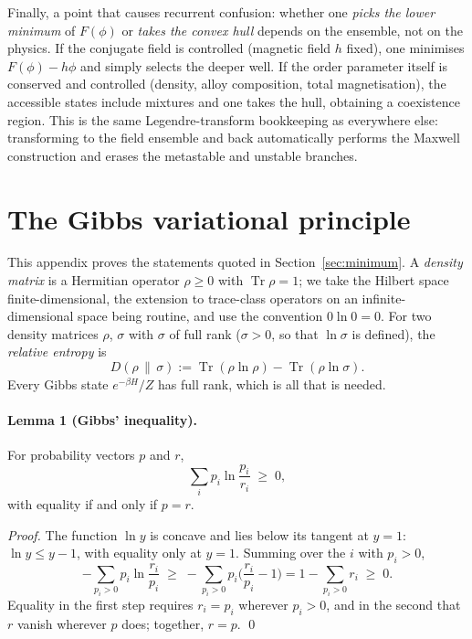 \documentclass[10pt,a4paper]{article}
\theoremstyle{remark}
\newcommand{\Tr}{\operatorname{Tr}}
\begin{document}
Finally, a point that causes recurrent confusion: whether one \emph{picks the
lower minimum} of $F(\phi)$ or \emph{takes the convex
hull} depends on the ensemble, not on the physics. If the conjugate field is controlled (magnetic
field $h$ fixed), one minimises $F(\phi)-h\phi$ and simply selects the deeper
well. If the order parameter itself is conserved and controlled (density,
alloy composition, total magnetisation), the accessible states include mixtures
and one takes the hull, obtaining a coexistence region. This is the same
Legendre-transform bookkeeping as everywhere else:
transforming to the field ensemble and back automatically performs the
Maxwell construction and erases the metastable and unstable branches.


\section{The Gibbs variational principle}
\label{app:gibbsvar}

This appendix proves the statements quoted in Section~\ref{sec:minimum}. A
\emph{density matrix} is a Hermitian operator $ \rho \geq 0 $ with $ \Tr\rho = 1 $; we
take the Hilbert space finite-dimensional, the extension to trace-class operators
on an infinite-dimensional space being routine, and use the convention
$ 0\ln0 = 0 $. For two density matrices $ \rho $, $ \sigma $ with $ \sigma $ of full rank
($ \sigma > 0 $, so that $ \ln\sigma $ is defined), the \emph{relative entropy} is
\[
  D(\rho\,\|\,\sigma) := \Tr(\rho\ln\rho) - \Tr(\rho\ln\sigma) .
\]
Every Gibbs state $ e^{-\beta\hat H}/Z $ has full rank, which is all that is needed.

\paragraph{Lemma 1 (Gibbs' inequality).} For probability vectors $ p $ and $ r $,
\[
  \sum_i p_i\ln\frac{p_i}{r_i} \;\geq\; 0 ,
\]
with equality if and only if $ p = r $.

\emph{Proof.} The function $ \ln y $ is concave and lies below its tangent at
$ y = 1 $: $ \ln y \leq y - 1 $, with equality only at $ y = 1 $. Summing over the $ i $
with $ p_i > 0 $,
\[
  -\sum_{p_i > 0}p_i\ln\frac{r_i}{p_i}
  \;\geq\; -\sum_{p_i > 0}p_i\Big(\frac{r_i}{p_i} - 1\Big)
  = 1 - \sum_{p_i > 0}r_i \;\geq\; 0 .
\]
Equality in the first step requires $ r_i = p_i $ wherever $ p_i > 0 $, and in the
second that $ r $ vanish wherever $ p $ does; together, $ r = p $. \qed
\end{document}

